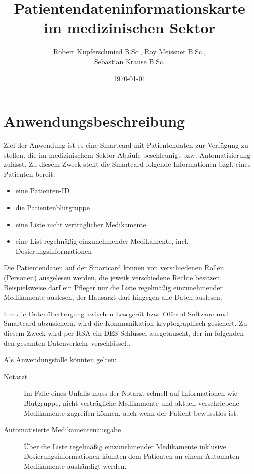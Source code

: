 \documentclass[parskip]{scrartcl}
\begin{document}
	\subject{Projektdokumentation im Modul Smartcard}
	\title{Patientendateninformationskarte im medizinischen Sektor}
	\author{Robert Kupferschmied B.Sc., Roy Meissner B.Sc.,\\Sebastian Krause B.Sc.}
	\date{\today}
	
	\maketitle
	
	\onehalfspacing
	\section{Anwendungsbeschreibung}
		Ziel der Anwendung ist es eine Smartcard mit Patientendaten zur Verfügung zu stellen, die im medizinischem Sektor Abläufe beschleunigt bzw. Automatisierung zulässt. Zu diesem Zweck stellt die Smartcard folgende Informationen bzgl. eines Patienten bereit:
		
		\begin{itemize}
			\item eine Patienten-ID
			\item die Patientenblutgruppe
			\item eine Liste nicht verträglicher Medikamente
			\item eine List regelmäßig einzunehmender Medikamente, incl. Dosierungsinformationen
		\end{itemize}
		
		Die Patientendaten auf der Smartcard können von verschiedenen Rollen (Personen) ausgelesen werden, die jeweils verschiedene Rechte besitzen. Beispielsweise darf ein Pfleger nur die Liste regelmäßig einzunehmender Medikamente auslesen, der Hausarzt darf hingegen alle Daten auslesen.
		
		Um die Datenübertragung zwischen Lesegerät bzw. Offcard-Software und Smartcard abzusichern, wird die Kommunikation kryptographisch gesichert. Zu diesem Zweck wird per RSA ein DES-Schlüssel ausgetauscht, der im folgenden den gesamten Datenverkehr verschlüsselt.
				
		Als Anwendungsfälle könnten gelten:
	
		\begin{description}
			\item[Notarzt] Im Falle eines Unfalls muss der Notarzt schnell auf Informationen wie Blutgruppe, nicht verträgliche Medikamente und aktuell verschriebene Medikamente zugreifen können, auch wenn der Patient bewusstlos ist. 
			\item[Automatisierte Medikamentenausgabe] Über die Liste regelmäßig einzunehmender Me\-dikamente inklusive Dosierungsinformationen könnten dem Patienten an einem Automaten Medikamente aushändigt werden.
		\end{description}
		
\end{document}
